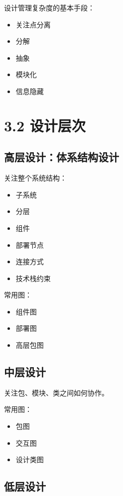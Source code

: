 \documentclass[UTF8,zihao=-4]{ctexart}
\begin{document}
设计管理复杂度的基本手段：

\begin{itemize}
\item 关注点分离
\item 分解
\item 抽象
\item 模块化
\item 信息隐藏
\end{itemize}

\section{3.2 设计层次}

\subsection{高层设计：体系结构设计}

关注整个系统结构：

\begin{itemize}
\item 子系统
\item 分层
\item 组件
\item 部署节点
\item 连接方式
\item 技术栈约束
\end{itemize}

常用图：

\begin{itemize}
\item 组件图
\item 部署图
\item 高层包图
\end{itemize}

\subsection{中层设计}

关注包、模块、类之间如何协作。

常用图：

\begin{itemize}
\item 包图
\item 交互图
\item 设计类图
\end{itemize}

\subsection{低层设计}
\end{document}

